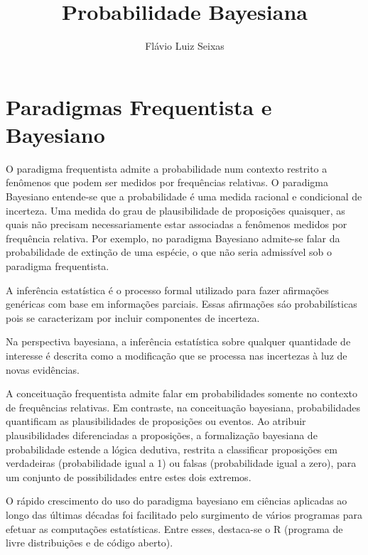 \documentclass[lnbip]{svmultln}
\begin{document}
\mainmatter
\title{Probabilidade Bayesiana}

\author{Flávio Luiz Seixas}

\maketitle

\section{Paradigmas Frequentista e Bayesiano}

O paradigma frequentista admite a probabilidade num contexto restrito a fenômenos que podem ser medidos por frequências relativas. O paradigma Bayesiano entende-se que a probabilidade é uma medida racional e condicional de incerteza. Uma medida do grau de plausibilidade de proposições quaisquer, as quais não precisam necessariamente estar associadas a fenômenos medidos por frequência relativa. Por exemplo, no paradigma Bayesiano admite-se falar da probabilidade de extinção de uma espécie, o que não seria admissível sob o paradigma frequentista.

A inferência estatística é o processo formal utilizado para fazer afirmações genéricas com base em informações parciais. Essas afirmações sáo probabilísticas pois se caracterizam por incluir componentes de incerteza.

Na perspectiva bayesiana, a inferência estatística sobre qualquer quantidade de interesse é descrita como a modificação que se processa nas incertezas à luz de novas evidências.

A conceituação frequentista admite falar em probabilidades somente no contexto de frequências relativas. Em contraste, na conceituação bayesiana, probabilidades quantificam as plausibilidades de proposições ou eventos. Ao atribuir plausibilidades diferenciadas a proposições, a formalização bayesiana de probabilidade estende a lógica dedutiva, restrita a classificar proposições em verdadeiras (probabilidade igual a 1) ou falsas (probabilidade igual a zero), para um conjunto de possibilidades entre estes dois extremos.

O rápido crescimento do uso do paradigma bayesiano em ciências aplicadas ao longo das últimas décadas foi facilitado pelo surgimento de vários programas para efetuar as computações estatísticas. Entre esses, destaca-se o R (programa de livre distribuições e de código aberto).
\end{document}
